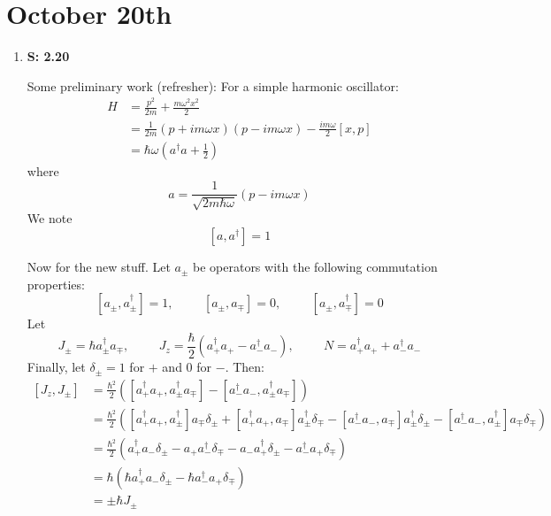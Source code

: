 \documentclass[12pt, letterpaper]{article}
\begin{document}
\section*{October 20th}
\begin{enumerate}
    \item[] \textbf{S: 2.20}
    
     Some preliminary work (refresher):
    For a simple harmonic oscillator:
    \begin{align}
        H&=\frac{p^2}{2m}+\frac{m\omega^2x^2}{2}\\&=\frac{1}{2m}\left(p+im\omega x\right)\left(p-im\omega x\right)-\frac{im\omega}{2} \left[x,p\right]\\&=\hbar\omega \left(a^\dagger a +\frac{1}{2}\right)
    \end{align}
    where
    \begin{equation}
        a=\frac{1}{\sqrt{2m\hbar \omega}}\left(p-im\omega x\right)
    \end{equation}
    We note
    \begin{equation}
        \left[a,a^\dagger\right]=1
    \end{equation}
    
    Now for the new stuff. Let $a_{\pm}$ be operators with the following commutation properties:
    \begin{equation}
        \left[a_{\pm},a_{\pm}^\dagger\right]=1,\hspace{1cm}\left[a_{\pm},a_{\mp}\right]=0, \hspace{1cm}\left[a_{\pm},a_{\mp}^\dagger\right]=0
    \end{equation}
    Let
    \begin{equation}
        J_{\pm}=\hbar a^{\dagger}_{\pm}a_{\mp},\hspace{1cm}J_z=\frac{\hbar}{2}\left(a_+^\dagger a_+-a_-^\dagger a_-\right),\hspace{1cm}N=a^\dagger_+a_++a_-^\dagger a_-
    \end{equation}
    Finally, let $\delta_{\pm}=1$ for $+$ and $0$ for $-$.
    Then:
    \begin{align}
        \left[J_z,J_{\pm}\right]&=\frac{\hbar^2}{2}\left(\left[a_+^\dagger a_+,a_{\pm}^\dagger a_{\mp}\right]-\left[a_-^\dagger a_-,a_{\pm}^\dagger a_{\mp}\right]\right)\\&=\frac{\hbar^2}{2}\left(\left[a_+^\dagger a_+,a_\pm ^\dagger\right]a_{\mp}\delta_{\pm}+\left[a_+^\dagger a_+,a_\mp \right]a_{\pm}^\dagger\delta_{\mp}-\left[a_-^\dagger a_-,a_{\mp}\right]a_{\pm}^\dagger \delta_{\pm}-\left[a_-^\dagger a_-,a_{\pm}^\dagger\right]a_{\mp}\delta_{\mp}\right)\\&=\frac{\hbar^2}{2}\left(a_+^\dagger a_-\delta_{\pm}-a_+a_-^\dagger\delta_{\mp}-a_-a_+^\dagger\delta_{\pm}-a_-^\dagger a_+\delta_{\mp}\right)\\&=\hbar \left(\hbar a_+^\dagger a_-\delta_{\pm}-\hbar a_-^\dagger a_+\delta_\mp\right)\\&=\pm \hbar J_{\pm}
    \end{align}
    

\end{enumerate}
\end{document}
